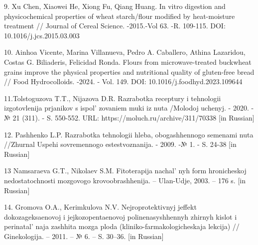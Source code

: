 \begin{references}
9. Xu Chen, Xiaowei He, Xiong Fu, Qiang Huang. In vitro digestion and
physicochemical properties of wheat starch/flour modified by
heat-moisture treatment // Journal of Cereal Science. -2015.-Vol 63. -R.
109-115. DOI: 10.1016/j.jcs.2015.03.003

10. Ainhoa Vicente, Marina Villanueva, Pedro A. Caballero, Athina
Lazaridou, Costas G. Biliaderis, Felicidad Ronda. Flours from
microwave-treated buckwheat grains improve the physical properties and
nutritional quality of gluten-free bread // Food Hydrocolloids. -2024. -
Vol. 149. \linebreak DOI: 10.1016/j.foodhyd.2023.109644

11.Tolstoguzova T.T., Nijazova D.R. Razrabotka receptury i tehnologii
izgotovlenija prjanikov s ispol' zovaniem muki iz nuta
/Molodoj uchenyj. - 2020. -№ 21 (311). - S. 550-552. URL:
https://moluch.ru/archive/311/70338 {[}in Russian{]}

12. Pashhenko L.P. Razrabotka tehnologii hleba, obogashhennogo semenami
nuta //Zhurnal Uspehi \linebreak  sovremennogo estestvoznanija. - 2009. -№ 1. - S.
24-38 {[}in Russian{]}

13 Namsaraeva G.T., Nikolaev S.M. Fitoterapija
nachal' nyh form hronicheskoj nedostatochnosti mozgovogo
krovoobrashhenija. -- Ulan-Udje, 2003. -- 176 s. {[}in Russian{]}

14. Gromova O.A., Kerimkulova N.V. Nejroprotektivnyj jeffekt
dokozageksaenovoj i jejkozopentaenovoj polinenasyshhennyh zhirnyh kislot
i perinatal' naja zashhita mozga ploda
(kliniko-farmakologicheskaja lekcija) // Ginekologija. -- 2011. -- № 6.
-- S. 30--36. {[}in Russian{]}

\end{references}

